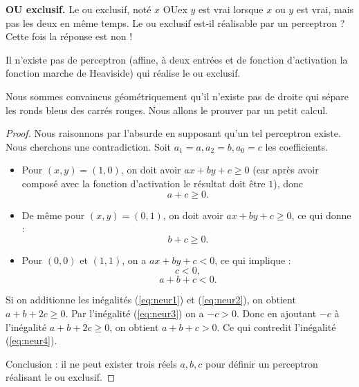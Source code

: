 \bigskip
\textbf{OU exclusif.}
Le ou exclusif, noté \og{}$x$ OUex $y$\fg{} est vrai lorsque $x$ ou $y$ est vrai, mais pas les deux en même temps. Le ou exclusif est-il réalisable par un perceptron ? Cette fois la réponse est non !



\begin{proposition}{}{}
	Il n'existe pas de perceptron (affine, à deux entrées et de fonction d'activation la fonction marche de Heaviside) qui réalise le \og{}ou exclusif\fg{}.
\end{proposition}

Nous sommes convaincus géométriquement qu'il n'existe pas de droite qui sépare les ronds bleus des carrés rouges. Nous allons le prouver par un petit calcul.

\begin{proof}
	Nous raisonnons par l'absurde en supposant qu'un tel perceptron existe. Nous cherchons une contradiction. 
	Soit $a_1=a,a_2=b,a_0=c$ les coefficients.
	
	\begin{center}
		\begin{minipage}{0.35\textwidth}
		\end{minipage}
		\begin{minipage}{0.45\textwidth}
		\end{minipage}
	\end{center}
	
	\begin{itemize}
		\item Pour $(x,y)=(1,0)$, on doit avoir $ax+by+c\ge0$ (car après avoir composé avec la fonction d'activation le résultat doit être $1$), 
		donc 
		\begin{equation}
			\label{eq:neur1}
			a+c \ge 0.
		\end{equation}
		\item De même pour $(x,y)=(0,1)$, on doit avoir $ax+by+c\ge0$, ce qui donne :
		\begin{equation}
			\label{eq:neur2}
			b+c \ge 0.
		\end{equation}
		\item Pour $(0,0)$ et $(1,1)$, on a $ax+by+c<0$, ce qui implique :
		\begin{equation}
			\label{eq:neur3}
			c<0,
		\end{equation}  
		\begin{equation}
			\label{eq:neur4}
			a+b+c<0.
		\end{equation}
	\end{itemize}
	
	Si on additionne les inégalités (\ref{eq:neur1}) et (\ref{eq:neur2}), on obtient $a+b+2c\ge0$. Par l'inégalité (\ref{eq:neur3}) on a $-c>0$. Donc en ajoutant $-c$ à l'inégalité $a+b+2c\ge0$, on obtient $a+b+c>0$. Ce qui contredit l'inégalité  (\ref{eq:neur4}).
	
	Conclusion : il ne peut exister trois réels $a,b,c$ pour définir un perceptron réalisant le \og{}ou exclusif\fg{}.
	
\end{proof}


